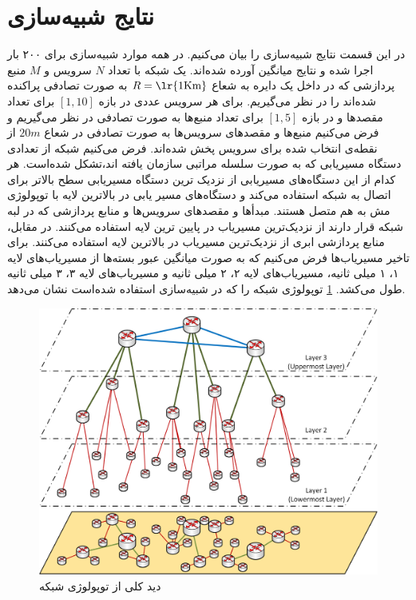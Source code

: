   \section{نتایج شبیه‌سازی}
    در این قسمت نتایج شبیه‌سازی را بیان می‌کنیم.
    در همه موارد شبیه‌سازی برای ۲۰۰ بار اجرا شده و نتایج میانگین آورده شده‌اند.
    یک شبکه با تعداد $N$ سرویس و $M$ منبع پردازشی که در داخل یک دایره به شعاع $R=\text{\lr{1Km}}$ به صورت تصادفی پراکنده ‌شده‌اند را در نظر می‌گیریم.
    برای هر سرویس عددی در بازه $[1,10]$ برای تعداد مقصد‌ها و در بازه $[1,5]$ برای تعداد منبع‌ها به صورت تصادفی در نظر می‌گیریم و فرض می‌کنیم منبع‌ها و مقصد‌های سرویس‌ها به صورت تصادفی در شعاع $20m$ از نقطه‌ی انتخاب شده برای سرویس پخش شده‌اند.
    فرض می‌کنیم شبکه از تعدادی دستگاه مسیریابی که به صورت سلسله مراتبی سازمان یافته اند،‌تشکل شده‌است.
    هر کدام از این دستگاه‌های مسیر‌یابی از نزدیک ترین دستگاه مسیریابی سطح بالاتر برای اتصال به شبکه استفاده می‌کند و دستگاه‌های مسیر یابی در بالاترین لایه با توپولوژی مش به هم متصل هستند.
    مبدأ‌ها و مقصدهای سرویس‌ها و منابع پردازشی که در لبه شبکه قرار دارند از نزدیک‌ترین مسیریاب در پایین ترین لایه استفاده می‌کنند.
    در مقابل، منابع پردازشی ابری از نزدیک‌ترین مسیریاب در بالاترین لایه استفاده می‌کنند.
    برای تاخیر مسیریاب‌ها فرض می‌کنیم که به صورت میانگین عبور بسته‌ها از مسیریاب‌های لایه ۱، ۱ میلی ثانیه، مسیریاب‌های لایه ۲، ۲ میلی ثانیه و مسیریاب‌های لایه ۳، ۳ میلی ثانیه طول می‌کشد.
    \cref{fig:network} توپولوژی شبکه را که در شبیه‌سازی استفاده شده‌است نشان می‌دهد.
    
    \begin{figure}[h]
      \centerline{\includegraphics[width=15cm]{graphics/one_to_one/network}}
      \caption{دید کلی از توپولوژی شبکه}
      \label{fig:network}
    \end{figure}

